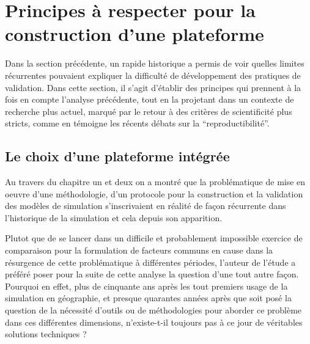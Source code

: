 
\section{Principes à respecter pour la construction d'une plateforme }
\label{sec:constante_problematique}



Dans la section précédente, un rapide historique a permis de voir quelles limites récurrentes pouvaient expliquer la difficulté de développement des pratiques de validation. Dans cette section, il s'agit d'établir des principes qui prennent à la fois en compte l'analyse précédente, tout en la projetant dans un contexte de recherche plus actuel, marqué par le retour à des critères de scientificité plus stricts, comme en témoigne les récents débats sur la \enquote{reproductibilité}.

\subsection{Le choix d'une plateforme intégrée}
\label{ssec:choix_plateforme_integree}


Au travers du chapitre un et deux on a montré que la problématique de mise en oeuvre d'une méthodologie, d'un protocole pour la construction et la validation des modèles de simulation s'inscrivaient en réalité de façon récurrente dans l'historique de la simulation et cela depuis son apparition. 

Plutot que de se lancer dans un difficile et probablement impossible exercice de comparaison pour la formulation de facteurs communs en cause dans la résurgence de cette problématique à différentes périodes, l'auteur de l'étude a préféré poser pour la suite de cette analyse la question d'une tout autre façon. Pourquoi en effet, plus de cinquante ans après les tout premiers usage de la simulation en géographie, et presque quarantes années après que soit posé la question de la nécessité d'outils ou de méthodologies pour aborder ce problème dans ces différentes dimensions, n'existe-t-il toujours pas à ce jour de véritables solutions techniques ?

